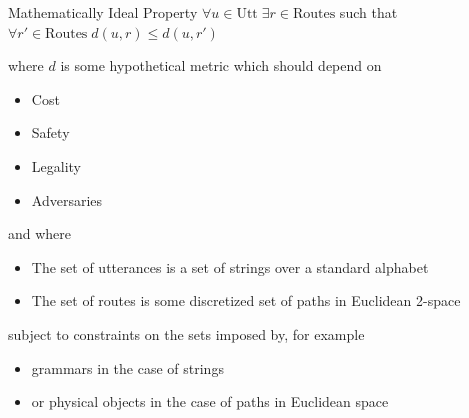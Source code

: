 \documentclass{beamer}
\begin{document}
\begin{frame}
\begin{block}{Mathematically Ideal Property}
  $\forall u \in \text{Utt}\; \exists r \in \text{Routes}$
  such that $\forall r' \in \text{Routes}\; d(u,r) \leq d(u,r')$
\end{block}
\pause
\begin{exampleblock}{}
where $d$ is some hypothetical metric which should depend on
\pause
\begin{itemize}[<+->]
\item Cost
\item Safety
\item Legality
\item Adversaries
\end{itemize}
\end{exampleblock}
\pause
\begin{exampleblock}{}
and where
\pause
\begin{itemize}[<+->]
\item The set of utterances is a set of strings over a standard alphabet
\item The set of routes is some discretized set of paths in Euclidean 2-space
\end{itemize}
\pause
subject to constraints on the sets imposed by, for example
\pause
\begin{itemize}[<+->]
\item grammars in the case of strings
\item or physical objects in the case of paths in Euclidean space
\end{itemize}
\end{exampleblock}






\end{frame}
\end{document}
